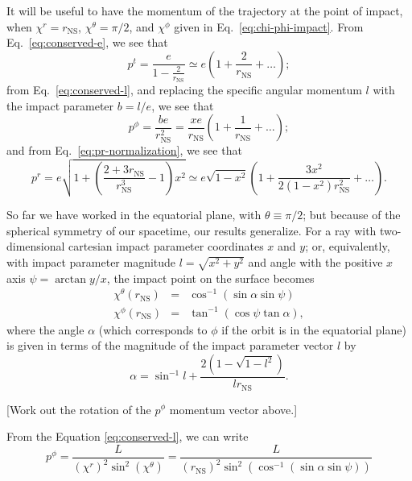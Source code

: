 \documentclass[modern]{aastex631}
\newcommand{\rNS}{r_\mathrm{NS}}
\begin{document}
It will be useful to have the momentum of the trajectory at the point of impact,
when $\chi^r = \rNS$, $\chi^\theta = \pi/2$, and $\chi^\phi$ given in Eq.\
\eqref{eq:chi-phi-impact}.  From Eq.\ \eqref{eq:conserved-e}, we see that 
\begin{equation}
    p^t = \frac{e}{1 - \frac{2}{\rNS}} \simeq e \left( 1 + \frac{2}{\rNS} + \ldots \right);
\end{equation}
from Eq.\ \eqref{eq:conserved-l}, and replacing the specific angular momentum
$l$ with the impact parameter $b = l/e$, we see that 
\begin{equation}
    p^\phi = \frac{b e}{\rNS^2} = \frac{x e}{\rNS} \left( 1 + \frac{1}{\rNS} + \ldots \right);
\end{equation}
and from Eq.\ \eqref{eq:pr-normalization}, we see that 
\begin{equation}
    p^r = e \sqrt{1 + \left( \frac{2 + 3 \rNS}{\rNS^3} - 1 \right) x^2} \simeq e \sqrt{1-x^2} \left( 1 + \frac{3 x^2}{2 \left( 1 - x^2 \right) \rNS^2} + \ldots \right).
\end{equation}

So far we have worked in the equatorial plane, with $\theta \equiv \pi/2$; but
because of the spherical symmetry of our spacetime, our results generalize.  For
a ray with two-dimensional cartesian impact parameter coordinates $x$ and $y$;
or, equivalently, with impact parameter magnitude $l = \sqrt{x^2 + y^2}$ and
angle with the positive $x$ axis $\psi = \arctan y/x$, the impact point on the
surface becomes 
\begin{eqnarray}
    \chi^\theta \left( \rNS \right) & = & \cos^{-1} \left( \sin \alpha \sin \psi \right)  \\
    \chi^\phi \left( \rNS \right) & = & \tan^{-1} \left( \cos \psi \tan \alpha \right),
\end{eqnarray}
where the angle $\alpha$ (which corresponds to $\phi$ if the orbit is in the
equatorial plane) is given in terms of the magnitude of the impact parameter
vector $l$ by
\begin{equation}
    \alpha = \sin^{-1} l + \frac{2 \left( 1 - \sqrt{1 - l^2} \right)}{l \rNS}.
\end{equation}

[Work out the rotation of the $p^\phi$ momentum vector above.]

From the Equation \ref{eq:conserved-l}, we can write
\begin{equation}
    p^{\phi} = \frac{L}{(\chi^r)^2 \sin^2(\chi^\theta)} = \frac{L}{(\rNS)^2 \sin^2(\cos^{-1} \left( \sin \alpha \sin \psi \right))}
\end{equation}
\end{document}
